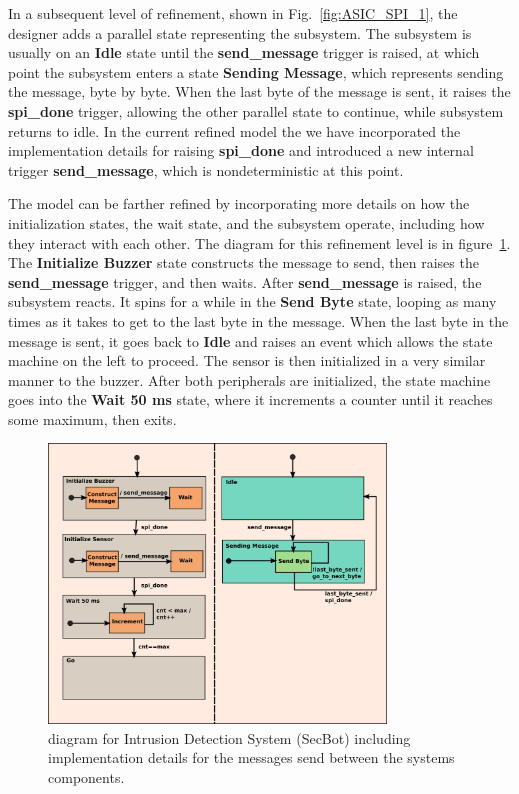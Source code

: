In a subsequent level of refinement, shown in Fig.~\ref{fig:ASIC_SPI_1}, the designer adds a parallel state representing the \SPI subsystem. The \SPI subsystem is usually on an \textbf{Idle} state until the \textbf{send\_message} trigger is raised, at which point the \SPI subsystem enters a state \textbf{Sending Message}, which represents sending the message, byte by byte. When the last byte of the message is sent, it raises the \textbf{spi\_done} trigger, allowing the other parallel state to continue, while \SPI subsystem returns to idle. In the current refined model the we have incorporated the implementation details for raising \textbf{spi\_done} and introduced a new internal trigger 
\textbf{send\_message}, which is nondeterministic at this point.

The model can be farther refined by incorporating more details on how the initialization states, the wait state, and the \SPI subsystem operate, including how they interact with each other. The \statechart diagram for this refinement level is in figure~\ref{fig:ASIC_SPI_2}. The \textbf{Initialize Buzzer} state constructs the \SPI message to send, then raises the \textbf{send\_message} trigger, and then waits.
After \textbf{send\_message} is raised, the \SPI subsystem reacts. It spins for a while in the \textbf{Send Byte} state, looping as many times as it takes to get to the last byte in the message. When the last byte in the message is sent, it goes back to \textbf{Idle} and raises an event which allows the state machine on the left to proceed. The sensor is then initialized in a very similar manner to the buzzer. After both peripherals are initialized, the state machine goes into the \textbf{Wait 50 ms} state, where it increments a counter until it reaches some maximum, then exits.

\begin{figure}[!htbp]
  \begin{centering}
  \includegraphics[width=0.8\textwidth]{figures/ASIC&SPI_2}
  \caption{\Statechart diagram for Intrusion Detection System (SecBot) including implementation details for the messages send between the systems components.}
  \label{fig:ASIC_SPI_2}
  \end{centering}
\end{figure} 

